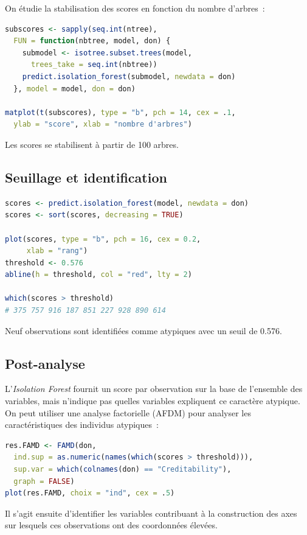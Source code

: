 \documentclass[a4paper,11pt]{article}
\theoremstyle{definition}
\theoremstyle{remark}
\begin{document}
On \'etudie la stabilisation des scores en fonction du nombre d'arbres~:

\begin{lstlisting}[language=R]
subscores <- sapply(seq.int(ntree),
  FUN = function(nbtree, model, don) {
    submodel <- isotree.subset.trees(model,
      trees_take = seq.int(nbtree))
    predict.isolation_forest(submodel, newdata = don)
  }, model = model, don = don)

matplot(t(subscores), type = "b", pch = 14, cex = .1,
  ylab = "score", xlab = "nombre d'arbres")
\end{lstlisting}

Les scores se stabilisent \`a partir de 100 arbres.

\subsection{Seuillage et identification}

\begin{lstlisting}[language=R]
scores <- predict.isolation_forest(model, newdata = don)
scores <- sort(scores, decreasing = TRUE)

plot(scores, type = "b", pch = 16, cex = 0.2,
     xlab = "rang")
threshold <- 0.576
abline(h = threshold, col = "red", lty = 2)

which(scores > threshold)
# 375 757 916 187 851 227 928 890 614
\end{lstlisting}

Neuf observations sont identifi\'ees comme atypiques avec un seuil
de 0.576.

\subsection{Post-analyse}

L'\emph{Isolation Forest} fournit un score par observation sur la base
de l'ensemble des variables, mais n'indique pas quelles variables
expliquent ce caract\`ere atypique. On peut utiliser une analyse
factorielle (AFDM) pour analyser les caract\'eristiques des individus
atypiques~:

\begin{lstlisting}[language=R]
res.FAMD <- FAMD(don,
  ind.sup = as.numeric(names(which(scores > threshold))),
  sup.var = which(colnames(don) == "Creditability"),
  graph = FALSE)
plot(res.FAMD, choix = "ind", cex = .5)
\end{lstlisting}

Il s'agit ensuite d'identifier les variables contribuant \`a la
construction des axes sur lesquels ces observations ont des
coordonn\'ees \'elev\'ees.
\end{document}
